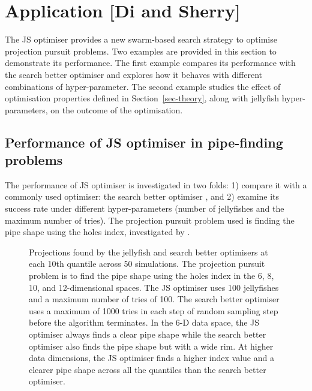 \documentclass[
  number,
  preprint,
  3p]{elsarticle}
\begin{document}
\section{Application {[}Di and Sherry{]}}\label{sec-app}

The JS optimiser provides a new swarm-based search strategy to optimise
projection pursuit problems. Two examples are provided in this section
to demonstrate its performance. The first example compares its
performance with the search better optimiser and explores how it behaves
with different combinations of hyper-parameter. The second example
studies the effect of optimisation properties defined in
Section~\ref{sec-theory}, along with jellyfish hyper-parameters, on the
outcome of the optimisation.

\subsection{Performance of JS optimiser in pipe-finding
problems}\label{sec-app-1}

The performance of JS optimiser is investigated in two folds: 1) compare
it with a commonly used optimiser: the search better optimiser
\citep{RJ-2021-105, laa_using_2020}, and 2) examine its success rate
under different hyper-parameters (number of jellyfishes and the maximum
number of tries). The projection pursuit problem used is finding the
pipe shape using the holes index, investigated by
\citet{laa_using_2020}.

\begin{figure}


\caption{\label{fig-proj}Projections found by the jellyfish and search
better optimisers at each 10th quantile across 50 simulations. The
projection pursuit problem is to find the pipe shape using the holes
index in the 6, 8, 10, and 12-dimensional spaces. The JS optimiser uses
100 jellyfishes and a maximum number of tries of 100. The search better
optimiser uses a maximum of 1000 tries in each step of random sampling
step before the algorithm terminates. In the 6-D data space, the JS
optimiser always finds a clear pipe shape while the search better
optimiser also finds the pipe shape but with a wide rim. At higher data
dimensions, the JS optimiser finds a higher index value and a clearer
pipe shape across all the quantiles than the search better optimiser.}

\end{figure}%
\end{document}
